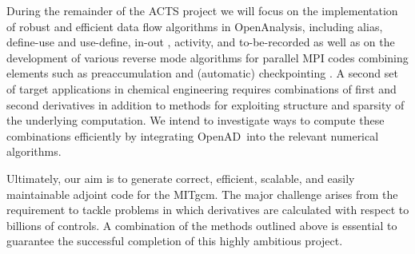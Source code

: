 \documentclass[11pt]{article}
\newcommand{\OpenAD}{OpenAD}
\newcommand{\OpenAnalysis}{OpenAnalysis}
\begin{document}
During the remainder of the ACTS project we will focus on the implementation
of robust and efficient data flow algorithms in \OpenAnalysis, including alias, 
define-use and use-define, in-out \cite{Muc97}, 
activity, and to-be-recorded \cite{HNP02} as well as on 
the development of various reverse mode algorithms for parallel MPI codes
combining elements such as preaccumulation and (automatic) checkpointing
\cite{Gri92}. 
A second set of target 
applications in chemical engineering \cite{FTB97} requires combinations of first and 
second derivatives in addition to methods for exploiting structure and sparsity
of the underlying computation. We intend to investigate ways to compute these
combinations efficiently by integrating \OpenAD\ into the relevant 
numerical algorithms.

Ultimately, our aim is to generate correct, efficient, scalable, and easily 
maintainable adjoint code for the MITgcm. The major challenge arises from the
requirement to tackle problems in which derivatives are calculated with respect 
to billions of controls. A combination of the methods outlined above is 
essential to guarantee the successful completion of this highly ambitious
project.

%




\end{document}

